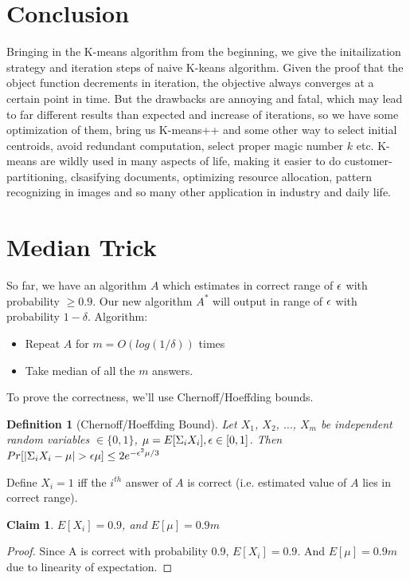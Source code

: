 \documentclass[11pt]{article}
\newtheorem{definition}[theorem]{Definition}
\newtheorem{claim}[theorem]{Claim}
\def\eps{\ensuremath\epsilon}
\begin{document}
\section{Conclusion}
Bringing in the K-means algorithm from the beginning, we give the initailization strategy and iteration steps of naive K-keans algorithm.
Given the proof that the object function decrements in iteration, the objective always converges at a certain point in time. But the drawbacks are annoying and fatal, which may lead to far different results than expected and increase of iterations, so we have some optimization of them, bring us K-means++ and some other way to select initial centroids, avoid redundant computation, select proper magic number $k$ etc.
K-means are wildly used in many aspects of life, making it easier to do customer-partitioning, clsasifying documents, optimizing resource allocation, pattern recognizing in images and so many other application in industry and daily life.

\section{Median Trick}
So far, we have an algorithm $A$ which estimates in correct range of $\eps$ with probability $\ge 0.9$. Our new algorithm $A^{\ast}$ will output in range of $\eps$ with probability $1-\delta$.
Algorithm:
\begin{itemize}
\item Repeat $A$ for $m=O(log (1/\delta))$ times
\item Take median of all the $m$ answers.
\end{itemize}

To prove the correctness, we'll use Chernoff/Hoeffding bounds.

\begin{definition}
[Chernoff/Hoeffding Bound]
Let $X_{1}$, $X_{2}$, $\ldots$, $X_{m}$ be independent random variables $\in \{0,1\}$,
$\mu = E[\Sigma_{i} X_{i}], \eps \in [0,1]$.
Then $Pr[|\Sigma_{i} X_{i}-\mu| > \eps\mu] \leq 2e^{-\eps^{2}\mu/3}$
\end{definition}

Define $X_{i} = 1$ iff the $i^{th}$ answer of $A$ is correct (i.e. estimated value of $A$ lies in correct range).

\begin{claim}
$E[X_{i}] = 0.9$, and $E[\mu] = 0.9m$
\end{claim}

\begin{proof}
Since A is correct with probability 0.9, $E[X_{i}] = 0.9$. And $E[\mu] = 0.9m$ due to linearity of expectation.
\end{proof}
\end{document}
